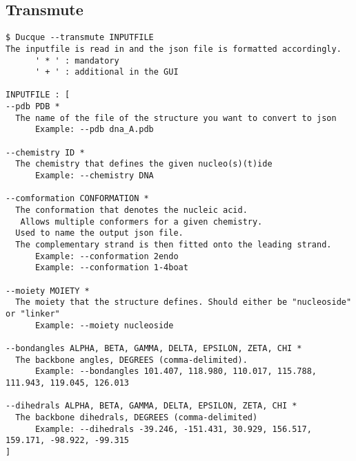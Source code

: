 
\subsection{Transmute}
\begin{verbatim}
$ Ducque --transmute INPUTFILE
The inputfile is read in and the json file is formatted accordingly.
      ' * ' : mandatory
      ' + ' : additional in the GUI

INPUTFILE : [
--pdb PDB *
  The name of the file of the structure you want to convert to json
      Example: --pdb dna_A.pdb

--chemistry ID *
  The chemistry that defines the given nucleo(s)(t)ide
      Example: --chemistry DNA

--comformation CONFORMATION *
  The conformation that denotes the nucleic acid.
   Allows multiple conformers for a given chemistry.
  Used to name the output json file.
  The complementary strand is then fitted onto the leading strand.
      Example: --conformation 2endo
      Example: --conformation 1-4boat

--moiety MOIETY *
  The moiety that the structure defines. Should either be "nucleoside" or "linker"
      Example: --moiety nucleoside

--bondangles ALPHA, BETA, GAMMA, DELTA, EPSILON, ZETA, CHI *
  The backbone angles, DEGREES (comma-delimited).
      Example: --bondangles 101.407, 118.980, 110.017, 115.788, 111.943, 119.045, 126.013

--dihedrals ALPHA, BETA, GAMMA, DELTA, EPSILON, ZETA, CHI *
  The backbone dihedrals, DEGREES (comma-delimited)
      Example: --dihedrals -39.246, -151.431, 30.929, 156.517, 159.171, -98.922, -99.315
]
    
\end{verbatim}
